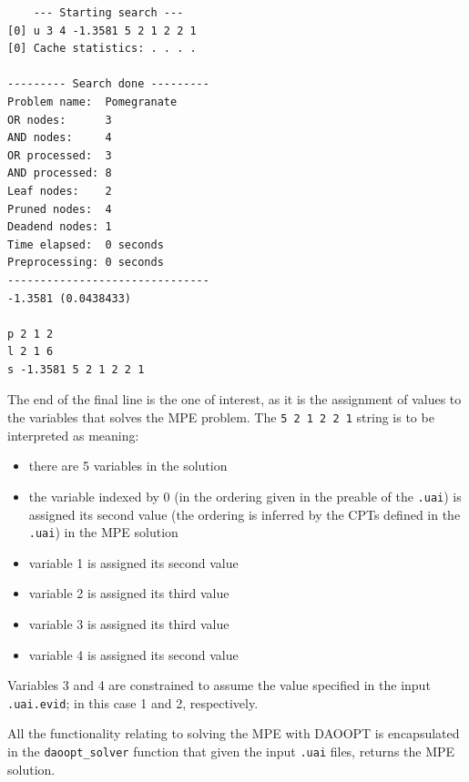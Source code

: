 \begin{minipage}{\textwidth}
	\begin{framed}
\begin{verbatim}
	--- Starting search ---
[0] u 3 4 -1.3581 5 2 1 2 2 1
[0] Cache statistics: . . . .

--------- Search done ---------
Problem name:  Pomegranate
OR nodes:      3
AND nodes:     4
OR processed:  3
AND processed: 8
Leaf nodes:    2
Pruned nodes:  4
Deadend nodes: 1
Time elapsed:  0 seconds
Preprocessing: 0 seconds
-------------------------------
-1.3581 (0.0438433)

p 2 1 2
l 2 1 6
s -1.3581 5 2 1 2 2 1
\end{verbatim}	
\end{framed}
\end{minipage}
The end of the final line is the one of interest, as it is the assignment of values to the variables that solves the MPE problem.
The \texttt{5 2 1 2 2 1} string is to be interpreted as meaning:
\begin{itemize}
  \item there are 5 variables in the solution
  \item the variable indexed by 0 (in the ordering given in the preable of the \texttt{.uai}) is assigned its second value (the ordering is inferred by the CPTs defined in the \texttt{.uai}) in the MPE solution
  \item variable 1 is assigned its second value
  \item variable 2 is assigned its third value
  \item variable 3 is assigned its third value
  \item variable 4 is assigned its second value
\end{itemize}
Variables 3 and 4 are constrained to assume the value specified in the input \texttt{.uai.evid}; in this case 1 and 2, respectively.

All the functionality relating to solving the MPE with DAOOPT is encapsulated in the \texttt{daoopt\_solver} function that given the input \texttt{.uai} files, returns the MPE solution.


